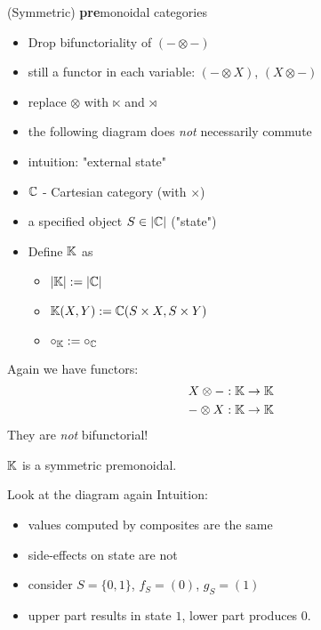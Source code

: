 \begin{frame}
    \begin{center}\LARGE (Symmetric) {\bf pre}monoidal categories\end{center}
    \begin{itemize}
        \item Drop bifunctoriality of $(- \otimes -)$
        \item still a functor in each variable: $(- \otimes X)$, $(X \otimes -)$
        \item replace $\otimes$ with $\ltimes$ and $\rtimes$
        \item the following diagram does \emph{not} necessarily commute
        \binoidaldiag
        \item intuition: "external state"
    \end{itemize}
\end{frame}

\begin{frame}
\begin{example}
    \begin{itemize}
        \item $\mathbb{C}$ - Cartesian category (with $\times$)
        \item a specified object $S \in |\mathbb{C}|$ ("state")
        \item Define $\mathbb{K}$ as
        \begin{itemize}
            \item $|\mathbb{K}| := |\mathbb{C}|$
            \item $\mathbb{K}(X, Y) := \mathbb{C}(S \times X, S \times Y)$
            \item $\circ_{\mathbb{K}} := \circ_{\mathbb{C}}$
        \end{itemize}
    \end{itemize}
    Again we have functors:
    \begin{align*}
    X \otimes -: \mathbb{K} \to \mathbb{K} \\
    - \otimes X: \mathbb{K} \to \mathbb{K}
    \end{align*}
    They are \emph{not} bifunctorial!

    $\mathbb{K}$ is a symmetric premonoidal.
\end{example}
\end{frame}

\begin{frame}
\begin{example}[continued]
    Look at the diagram again
    \binoidaldiag
    Intuition:
    \begin{itemize}
        \item values computed by composites are the same
        \item side-effects on state are not
        \item consider $S = \{0, 1\}$, $f_S = (0)$, $g_S = (1)$
        \item upper part results in state $1$, lower part produces $0$.
    \end{itemize}
\end{example}
\end{frame}

